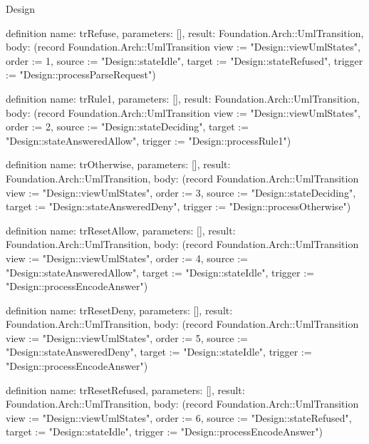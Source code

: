 \begin{lexlean}{Design}
\begin{semanticmodule}
definition{
  name: trRefuse,
  parameters: [],
  result: Foundation.Arch::UmlTransition,
  body: (record Foundation.Arch::UmlTransition {view := "Design::viewUmlStates", order := 1, source := "Design::stateIdle", target := "Design::stateRefused", trigger := "Design::processParseRequest"})
}

definition{
  name: trRule1,
  parameters: [],
  result: Foundation.Arch::UmlTransition,
  body: (record Foundation.Arch::UmlTransition {view := "Design::viewUmlStates", order := 2, source := "Design::stateDeciding", target := "Design::stateAnsweredAllow", trigger := "Design::processRule1"})
}

definition{
  name: trOtherwise,
  parameters: [],
  result: Foundation.Arch::UmlTransition,
  body: (record Foundation.Arch::UmlTransition {view := "Design::viewUmlStates", order := 3, source := "Design::stateDeciding", target := "Design::stateAnsweredDeny", trigger := "Design::processOtherwise"})
}

definition{
  name: trResetAllow,
  parameters: [],
  result: Foundation.Arch::UmlTransition,
  body: (record Foundation.Arch::UmlTransition {view := "Design::viewUmlStates", order := 4, source := "Design::stateAnsweredAllow", target := "Design::stateIdle", trigger := "Design::processEncodeAnswer"})
}

definition{
  name: trResetDeny,
  parameters: [],
  result: Foundation.Arch::UmlTransition,
  body: (record Foundation.Arch::UmlTransition {view := "Design::viewUmlStates", order := 5, source := "Design::stateAnsweredDeny", target := "Design::stateIdle", trigger := "Design::processEncodeAnswer"})
}

definition{
  name: trResetRefused,
  parameters: [],
  result: Foundation.Arch::UmlTransition,
  body: (record Foundation.Arch::UmlTransition {view := "Design::viewUmlStates", order := 6, source := "Design::stateRefused", target := "Design::stateIdle", trigger := "Design::processEncodeAnswer"})
}
\end{semanticmodule}
\end{lexlean}
